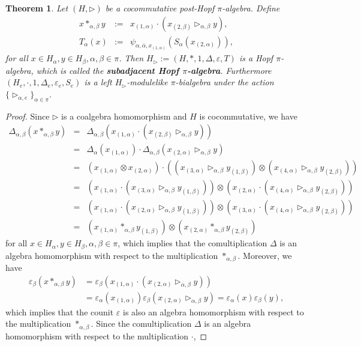 \documentclass[11pt]{article}
\def\a{\alpha}
\def\b{\beta}
\def\tr{\triangleright}
\def\v{\varepsilon}
\newtheorem{theorem}{Theorem}[section]
\begin{document}
\begin{theorem}  \label{thm:subHopf}
Let $(H,\tr)$ be a cocommutative post-Hopf $\pi$-algebra. Define
\begin{eqnarray}
\label{post-rbb-1} x *_{\a,\b} y &:=& x_{(1,\a)}\cdot (x_{(2,\b)}\tr_{\a,\b} y),\\
\label{post-rbb-2} T_\a(x) &:=& \psi_{\a,\bar{\a},x_{(1,\a)}}(S_\a(x_{(2,\a)})),
\end{eqnarray}
for all $x\in H_\a,y\in H_\b, \a,\b\in\pi$. Then $H_\tr:=(H,*,1,\Delta,\v,T)$ is a Hopf $\pi$-algebra, which is called the {\bf subadjacent Hopf $\pi$-algebra}. Furthermore $(H_e,\cdot,1,\Delta_e,\v_e,S_e)$ is a left $H_\tr$-modulelike $\pi$-bialgebra under the action $\{\tr_{\a,e}\}_{\a\in\pi}$.
\end{theorem}

\begin{proof}
Since $\tr$ is a coalgebra homomorphism and $H$ is cocommutative, we have
\begin{eqnarray*}
\Delta_{\a,\b}(x *_{\a,\b} y)&=&\Delta_{\a,\b}(x_{(1,\a)}\cdot (x_{(2,\b)}\tr_{\a,\b} y))\\
&=&\Delta_\a(x_{(1,\a)})\cdot \Delta_{\a,\b}(x_{(2,\a)}\tr_{\a,\b} y)\\
&=&(x_{(1,\a)}\otimes x_{(2,\a)})\cdot((x_{(3,\a)}\tr_{\a,\b} y_{(1,\b)})\otimes(x_{(4,\a)}\tr_{\a,\b} y_{(2,\b)}))\\
&=&(x_{(1,\a)}\cdot (x_{(3,\a)}\tr_{\a,\b} y_{(1,\b)}))\otimes (x_{(2,\a)}\cdot(x_{(4,\a)}\tr_{\a,\b} y_{(2,\b)}))\\
&=&(x_{(1,\a)}\cdot (x_{(2,\a)}\tr_{\a,\b} y_{(1,\b)}))\otimes (x_{(3,\a)}\cdot(x_{(4,\a)}\tr_{\a,\b} y_{(2,\b)}))\\
&=&(x_{(1,\a)} *_{\a,\b} y_{(1,\b)})\otimes(x_{(2,\a)} *_{\a,\b} y_{(2,\b)})
\end{eqnarray*}
for all $x\in H_\a,y\in H_\b, \a,\b\in\pi$, which implies  that the comultiplication $\Delta$ is an algebra homomorphism with respect to the multiplication $*_{\a,\b}$. 
Moreover, we have
\begin{align*}
  \v_\b(x *_{\a,\b} y) & =\v_\b(x_{(1,\a)}\cdot (x_{(2,\a)}\tr_{\a,\b} y)) \\
  & =\v_\a(x_{(1,\a)})\v_\b(x_{(2,\a)}\tr_{\a,\b} y)=\v_\a(x)\v_\b(y),
\end{align*}
which implies  that the counit $\v$ is also an algebra homomorphism with respect to the multiplication $*_{\a,\b}$. 
Since the comultiplication $\Delta$ is an algebra homomorphism with respect to the multiplication $\cdot$, 

\end{proof}
\end{document}
